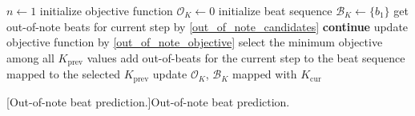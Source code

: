 \begin{algorithm}[ht!]
\begin{algorithmic}[1]
\State $n \gets 1$
    \State initialize objective function $\mathcal{O}_K\gets 0$
    \State initialize beat sequence $\mathcal{B}_K\gets \{b_1\}$
\EndFor
{}
        \State get out-of-note beats for current step by \eqref{out_of_note_candidates}
            \State \textbf{continue}
        \EndIf
            \State update objective function by \eqref{out_of_note_objective}
        \EndFor
        \State select the minimum objective among all $K_{\textrm{prev}}$ values
        \State add out-of-beats for the current step to the beat sequence mapped to the selected $K_{\textrm{prev}}$
    \EndFor
        \State update $\mathcal{O}_K$, $\mathcal{B}_K$ mapped with $K_{\textrm{cur}}$
    \EndFor
\EndFor
\State {}
\end{algorithmic}
[Out-of-note beat prediction.]{Out-of-note beat prediction.}
\end{algorithm}
